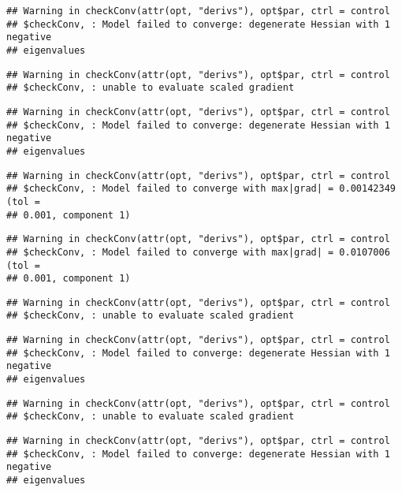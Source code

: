 \documentclass[]{article}
\begin{document}
\begin{verbatim}
## Warning in checkConv(attr(opt, "derivs"), opt$par, ctrl = control
## $checkConv, : Model failed to converge: degenerate Hessian with 1 negative
## eigenvalues
\end{verbatim}

\begin{verbatim}
## Warning in checkConv(attr(opt, "derivs"), opt$par, ctrl = control
## $checkConv, : unable to evaluate scaled gradient
\end{verbatim}

\begin{verbatim}
## Warning in checkConv(attr(opt, "derivs"), opt$par, ctrl = control
## $checkConv, : Model failed to converge: degenerate Hessian with 1 negative
## eigenvalues
\end{verbatim}

\begin{verbatim}
## Warning in checkConv(attr(opt, "derivs"), opt$par, ctrl = control
## $checkConv, : Model failed to converge with max|grad| = 0.00142349 (tol =
## 0.001, component 1)
\end{verbatim}

\begin{verbatim}
## Warning in checkConv(attr(opt, "derivs"), opt$par, ctrl = control
## $checkConv, : Model failed to converge with max|grad| = 0.0107006 (tol =
## 0.001, component 1)
\end{verbatim}

\begin{verbatim}
## Warning in checkConv(attr(opt, "derivs"), opt$par, ctrl = control
## $checkConv, : unable to evaluate scaled gradient
\end{verbatim}

\begin{verbatim}
## Warning in checkConv(attr(opt, "derivs"), opt$par, ctrl = control
## $checkConv, : Model failed to converge: degenerate Hessian with 1 negative
## eigenvalues
\end{verbatim}

\begin{verbatim}
## Warning in checkConv(attr(opt, "derivs"), opt$par, ctrl = control
## $checkConv, : unable to evaluate scaled gradient
\end{verbatim}

\begin{verbatim}
## Warning in checkConv(attr(opt, "derivs"), opt$par, ctrl = control
## $checkConv, : Model failed to converge: degenerate Hessian with 1 negative
## eigenvalues
\end{verbatim}
\end{document}
